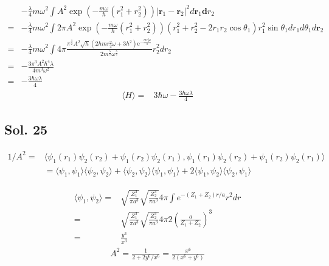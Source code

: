 \begin{enumerate}
    \begin{align*}
        &-\frac{\lambda}{4}m\omega^2
        \int 
        A^2
    \exp\left(
    -\frac{m\omega}{\hbar}(r_1^2+r_2^2)
    \right)|\bm r_1-\bm r_2|^2d\bm r_1\bm dr_2\\
    =&
    -\frac{\lambda}{4}m\omega^2
        \int 
        2\pi
        A^2
    \exp\left(
    -\frac{m\omega}{\hbar}(r_1^2+r_2^2)
    \right)(r_1^2+r_2^2-2r_1r_2\cos\theta_1)
    r_1^2\sin\theta_1
    dr_1d\theta_1d\bm r_2\\
    =&-\frac{\lambda}{4}m\omega^2
    \int 
    4\pi
    \frac{\pi^{\frac{3}{2}} A^{2} \sqrt{\hbar} \left(2hmr_{2}^{2} {\omega} + 3h^{2}\right) \mathrm{e}^{-\frac{mr_{2}^{2} {\omega}}{h}}}{2m^{\frac{5}{2}} {\omega}^{\frac{5}{2}}}
    r_2^2dr_2\\
    =&-\frac{3\pi^{3} A^{2} \hbar^{4} {\lambda}}{4m^{3} {\omega}^{2}}\\
    =&
    -\frac{3\hbar\omega {\lambda}}{4}
    \end{align*}
    \begin{align*}
        \langle H \rangle = &
        3\hbar\omega 
        -\frac{3\hbar\omega {\lambda}}{4}
    \end{align*}
\end{enumerate}

\subsection*{Sol. 25}
\begin{align*}
    1/A^2=&\langle \psi_1(r_1)\psi_2(r_2)
    +\psi_1(r_2)\psi_2(r_1),
    \psi_1(r_1)\psi_2(r_2)
    +\psi_1(r_2)\psi_2(r_1)
    \rangle\\
    &=
    \langle 
    \psi_1,
    \psi_1
    \rangle
    \langle 
    \psi_2,
    \psi_2
    \rangle
    +
    \langle 
    \psi_2,
    \psi_2
    \rangle
    \langle 
    \psi_1,
    \psi_1
    \rangle+
    2\langle
    \psi_1,
    \psi_2
    \rangle
    \langle
    \psi_2,
    \psi_1
    \rangle
\end{align*}

\begin{align*}
\langle \psi_1, \psi_2\rangle=&
\sqrt{\frac{Z_1^3}{\pi a^3}}    
\sqrt{\frac{Z_2^3}{\pi a^3}}
4\pi \int 
e^{-(Z_1+Z_2)r/a}r^2dr\\
=&
\sqrt{\frac{Z_1^3}{\pi a^3}}    
\sqrt{\frac{Z_2^3}{\pi a^3}}
4\pi
2 
\left(\frac{a}{Z_1+Z_2}\right)^3\\
=&
\frac{y^3}{x^3}
\end{align*}
\begin{align*}
    A^2 = \frac{1}{2+2y^6/x^6} = 
    \frac{x^6}{2(x^6+y^6)}
\end{align*}


